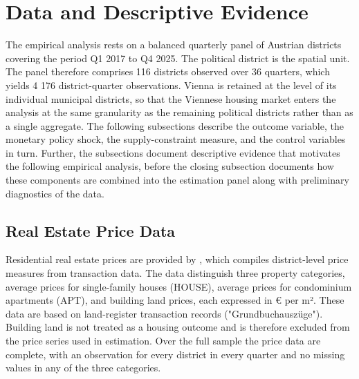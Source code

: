 \documentclass[a4paper,12pt, headsepline]{scrartcl}
\numberwithin{equation}{section}
\begin{document}
\section{Data and Descriptive Evidence}\label{sec:data}

The empirical analysis rests on a balanced quarterly panel of Austrian districts covering the period Q1 2017 to Q4 2025. The political district is the spatial unit. The panel therefore comprises 116 districts observed over 36 quarters, which yields 4 176 district-quarter observations. Vienna is retained at the level of its individual municipal districts, so that the Viennese housing market enters the analysis at the same granularity as the remaining political districts rather than as a single aggregate. The following subsections describe the outcome variable, the monetary policy shock, the supply-constraint measure, and the control variables in turn. Further, the subsections document descriptive evidence that motivates the following empirical analysis, before the closing subsection documents how these components are combined into the estimation panel along with preliminary diagnostics of the data.

\subsection{Real Estate Price Data}\label{subsec:price-data}
Residential real estate prices are provided by \citet{datascience2026}, which compiles district-level price measures from transaction data. The data distinguish three property categories, average prices for single-family houses (HOUSE), average prices for condominium apartments (APT), and building land prices, each expressed in € per m². These data are based on land-register transaction records ("Grundbuchauszüge"). Building land is not treated as a housing outcome and is therefore excluded from the price series used in estimation. Over the full sample the price data are complete, with an observation for every district in every quarter and no missing values in any of the three categories.
\end{document}

